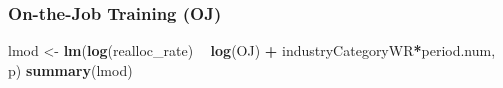 \documentclass[
]{article}
\newenvironment{Shaded}{\begin{snugshade}}{\end{snugshade}}
\newcommand{\KeywordTok}[1]{\textcolor[rgb]{0.13,0.29,0.53}{\textbf{#1}}}
\newcommand{\NormalTok}[1]{#1}
\newcommand{\OperatorTok}[1]{\textcolor[rgb]{0.81,0.36,0.00}{\textbf{#1}}}
\newcommand{\StringTok}[1]{\textcolor[rgb]{0.31,0.60,0.02}{#1}}
\begin{document}
\hypertarget{on-the-job-training-oj-1}{%
\subsubsection{On-the-Job Training
(OJ)}\label{on-the-job-training-oj-1}}

\begin{Shaded}
\begin{Highlighting}[]
\NormalTok{lmod <-}\StringTok{ }\KeywordTok{lm}\NormalTok{(}\KeywordTok{log}\NormalTok{(realloc_rate) }\OperatorTok{~}\StringTok{ }\KeywordTok{log}\NormalTok{(OJ) }\OperatorTok{+}\StringTok{ }\NormalTok{industryCategoryWR}\OperatorTok{*}\NormalTok{period.num, p)}
\KeywordTok{summary}\NormalTok{(lmod)}
\end{Highlighting}
\end{Shaded}
\end{document}

